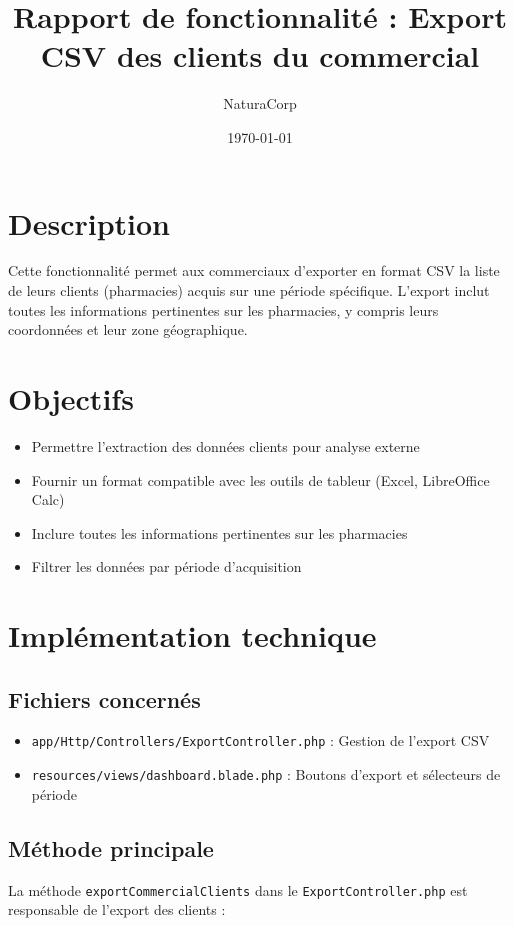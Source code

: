 \documentclass[12pt,a4paper]{article}
\title{Rapport de fonctionnalité : Export CSV des clients du commercial}
\author{NaturaCorp}
\date{\today}
\begin{document}
\maketitle

\section{Description}
Cette fonctionnalité permet aux commerciaux d'exporter en format CSV la liste de leurs clients (pharmacies) acquis sur une période spécifique. L'export inclut toutes les informations pertinentes sur les pharmacies, y compris leurs coordonnées et leur zone géographique.

\section{Objectifs}
\begin{itemize}
    \item Permettre l'extraction des données clients pour analyse externe
    \item Fournir un format compatible avec les outils de tableur (Excel, LibreOffice Calc)
    \item Inclure toutes les informations pertinentes sur les pharmacies
    \item Filtrer les données par période d'acquisition
\end{itemize}

\section{Implémentation technique}

\subsection{Fichiers concernés}
\begin{itemize}
    \item \texttt{app/Http/Controllers/ExportController.php} : Gestion de l'export CSV
    \item \texttt{resources/views/dashboard.blade.php} : Boutons d'export et sélecteurs de période
\end{itemize}

\subsection{Méthode principale}
La méthode \texttt{exportCommercialClients} dans le \texttt{ExportController.php} est responsable de l'export des clients :
\end{document}
